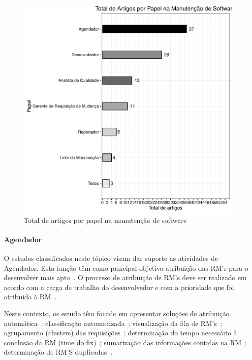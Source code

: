 \begin{figure}[htpb] \centering
	\includegraphics[width=0.8\linewidth]{chapter-mapeamento-sistematico/img/grafico_papel_por_artigo.pdf}
	\caption{Total de artigos por papel na manutenção de
		software}\label{fig:graf_papel_por_artigo} \end{figure}

\paragraph{Agendador} O estudos classificados neste tópico visam dar suporte as
atividades de Agendador. Esta função têm como principal objetivo atribuição das
RM’s para o desenvolver mais apto~\cite{banitaan2013decoba}. O processo de
atribuição de RM's deve ser realizado em acordo com a carga de trabalho do
desenvolvedor e com a prioridade que foi atribuída à
RM~\cite{chawla2015automated}. 

Neste contexto, os estudo têm focado em apresentar soluções de atribuição
automática~\cite{banitaan2013decoba, shokripour2012automatic,
	somasundaram2012automatici,Naguib2013, Zhang2014, Zanetti2013};
classificação automatizada~\cite{gegick2010identifying,liu2014faceted,
	behl2014bug, chawla2015automated,tian2015automated}; visualização da fila de
RM's~\cite{izquierdo2015gila}; agrupamento (clusters) das
requisições~\cite{liu2014faceted}; determinação do tempo necessário à conclusão
da RM (time do fix)~\cite{hosseini2012market,
	Bhattacharya:2011:BTP:1985441.1985472}; sumarização das informações contidas
na RM~\cite{mani2012ausum}; determinação de RM'S duplicadas~\cite{Sun2011,
	Wu2011a}.

